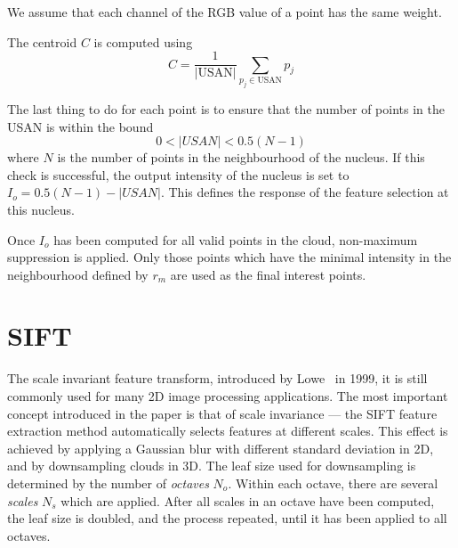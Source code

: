 \documentclass[11pt,a4paper]{kth-mag}
\begin{document}
We assume that each channel of the RGB value of a point has the same weight.

The centroid $C$ is computed using
\begin{equation}
  \label{eq:11}
  C=\frac{1}{\left|\text{USAN}\right|}\sum_{p_j \in \text{USAN}}p_j
\end{equation}

The last thing to do for each point is to ensure that the number of points in
the USAN is within the bound
\begin{equation}
  \label{eq:13}
  0 < \left| USAN \right| < 0.5(N-1)
\end{equation}
where $N$ is the number of points in the neighbourhood of the nucleus. If this
check is successful, the output intensity of the nucleus is set to
$I_o=0.5(N-1)-\left|USAN\right|$. This defines the response of the feature
selection at this nucleus.


Once $I_o$ has been computed for all valid points in the cloud, non-maximum
suppression is applied. Only those points which have the minimal intensity in
the neighbourhood defined by $r_m$ are used as the final interest points.

\section{SIFT}
The scale invariant feature transform, introduced by
Lowe~\cite{lowe2004distinctive} in 1999, it is still commonly used for many 2D
image processing applications. The most important concept introduced in the
paper is that of scale invariance --- the SIFT feature extraction method
automatically selects features at different scales. This effect is achieved by
applying a Gaussian blur with different standard deviation in 2D, and by
downsampling clouds in 3D. The leaf size used for downsampling is determined by
the number of \emph{octaves} $N_o$. Within each octave, there are several
\emph{scales} $N_s$ which are applied. After all scales in an octave have been
computed, the leaf size is doubled, and the process repeated, until it has been
applied to all octaves.
\end{document}
